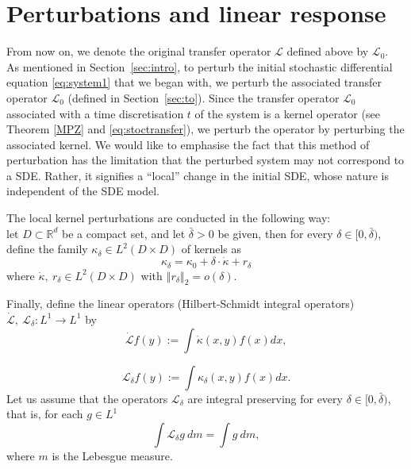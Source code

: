 \documentclass{amsart}
\newcommand\cL{{\mathcal L}}
\newcommand\bR{{\mathbb R}}
\newcommand{\norm}[1]{\left\Vert#1\right\Vert}
\begin{document}
\section{Perturbations and linear response}\label{sec:perturb}
From now on, we denote the original transfer operator \(\cL\) defined above by \(\cL_0\).\\
As mentioned in Section~\ref{sec:intro}, to perturb the initial stochastic differential equation \eqref{eq:system1} that we began with, we perturb the associated transfer operator \(\cL_0\) (defined in Section~\ref{sec:to}). Since the transfer operator $\cL_0$ associated with a time discretisation $t$ of the system is a kernel operator (see Theorem \ref{MPZ} and \eqref{eq:stoctransfer}), we perturb the operator by perturbing the associated kernel. We would like to emphasise the fact that this method of perturbation has the limitation that the perturbed system may not correspond to a SDE. Rather, it signifies a ``local'' change in the initial SDE, whose nature is independent of the SDE model. 

The local kernel perturbations are conducted in the following way:\\
let \(D\subset \bR^d\) be a compact set, and let \(\bar{\delta}>0\) be given, then for every \(\delta\in[0,\bar\delta)\), define the family \(\kappa_\delta\in L^2(D\times D)\) of kernels as 
\begin{equation}\label{eq:pert_kernel}
    \kappa_\delta=\kappa_0+\delta\cdot \dot{\kappa}+ r_\delta
\end{equation}
where \(\dot{\kappa},\ r_{\delta }\in L^{2}(D\times D)\) with \(\norm{r_{\delta }}_{2}=o(\delta )\). 

 Finally, define the linear operators (Hilbert-Schmidt integral operators) \(\dot \cL,\ \cL_\delta: L^1\to L^1\) by 
\begin{equation}\label{eq:diff_to}
    \dot \cL f(y):= \int \dot \kappa(x,y)f(x)dx,
\end{equation}

\begin{equation}\label{pert_to}
     \cL_\delta f(y):= \int \kappa_\delta(x,y)f(x)dx.
\end{equation}
Let us assume that the operators \(\cL_\delta\) are integral preserving for every \(\delta\in [0,\bar\delta)\), that is, for each \(g\in L^1\)
\[
\int\cL_\delta g\ dm=\int g\ dm,
\]
where \(m\) is the Lebesgue measure.
\end{document}

